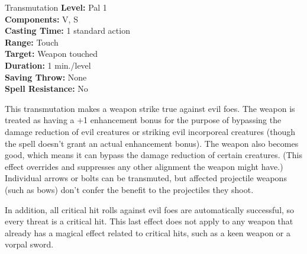 {Transmutation}
{
	\textbf{Level:}
	Pal 1\\
	\textbf{Components:}
	V, S\\
	\textbf{Casting Time:}
	1 standard action\\
	\textbf{Range:}
	Touch\\
	\textbf{Target:}
	Weapon touched\\
	\textbf{Duration:}
	1 min./level\\
	\textbf{Saving Throw:}
	None\\
	\textbf{Spell Resistance:}
	No\\
}
{
	This transmutation makes a weapon strike true against evil foes. The weapon is treated as having a +1 enhancement bonus for the purpose of bypassing the damage reduction of evil creatures or striking evil incorporeal creatures (though the spell doesn't grant an actual enhancement bonus). The weapon also becomes good, which means it can bypass the damage reduction of certain creatures. (This effect overrides and suppresses any other alignment the weapon might have.) Individual arrows or bolts can be transmuted, but affected projectile weapons (such as bows) don't confer the benefit to the projectiles they shoot.

	In addition, all critical hit rolls against evil foes are automatically successful, so every threat is a critical hit. This last effect does not apply to any weapon that already has a magical effect related to critical hits, such as a keen weapon or a vorpal sword.

}
